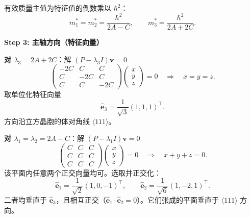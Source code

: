 \begin{derivationbox}[标准解题过程]
有效质量主值为特征值的倒数乘以 $\hbar^2$：
\begin{equation}
\boxed{m_1^*=m_2^*=\frac{\hbar^2}{2A-C},\qquad m_3^*=\frac{\hbar^2}{2A+2C}.}
\end{equation}

\textbf{Step 3: 主轴方向（特征向量）}

\textbf{对 $\lambda_3=2A+2C$}：解 $(P-\lambda_3I)\bm{v}=0$
\begin{equation}
\begin{pmatrix}
-2C & C & C \\[4pt]
C & -2C & C \\[4pt]
C & C & -2C
\end{pmatrix}
\begin{pmatrix}x\\y\\z\end{pmatrix}=0
\quad\Longrightarrow\quad x=y=z.
\end{equation}
取单位化特征向量
\begin{equation}
\hat{\bm{e}}_3=\frac{1}{\sqrt{3}}(1,1,1)^\top.
\end{equation}
方向沿立方晶胞的体对角线 $\langle111\rangle$。

\textbf{对 $\lambda_1=\lambda_2=2A-C$}：解 $(P-\lambda_1I)\bm{v}=0$
\begin{equation}
\begin{pmatrix}
C & C & C \\[4pt]
C & C & C \\[4pt]
C & C & C
\end{pmatrix}
\begin{pmatrix}x\\y\\z\end{pmatrix}=0
\quad\Longrightarrow\quad x+y+z=0.
\end{equation}
该平面内任意两个正交向量均可。选取并正交化：
\begin{equation}
\hat{\bm{e}}_1=\frac{1}{\sqrt{2}}(1,0,-1)^\top,\qquad
\hat{\bm{e}}_2=\frac{1}{\sqrt{6}}(1,-2,1)^\top.
\end{equation}
二者均垂直于 $\hat{\bm{e}}_3$，且相互正交（$\hat{\bm{e}}_1\cdot\hat{\bm{e}}_2=0$）。它们张成的平面垂直于 $\langle111\rangle$ 方向。
\end{derivationbox}

